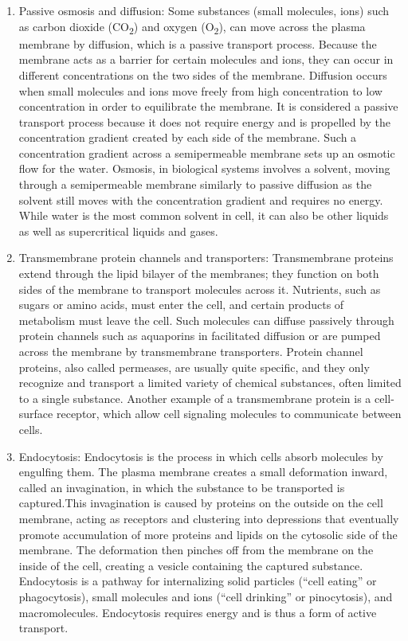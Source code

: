\documentclass[
]{book}
\begin{document}
\begin{enumerate}
\def\labelenumi{\arabic{enumi}.}
\item
  Passive osmosis and diffusion: Some substances (small molecules, ions) such as carbon dioxide (CO\textsubscript{2}) and oxygen (O\textsubscript{2}), can move across the plasma membrane by diffusion, which is a passive transport process. Because the membrane acts as a barrier for certain molecules and ions, they can occur in different concentrations on the two sides of the membrane. Diffusion occurs when small molecules and ions move freely from high concentration to low concentration in order to equilibrate the membrane. It is considered a passive transport process because it does not require energy and is propelled by the concentration gradient created by each side of the membrane. Such a concentration gradient across a semipermeable membrane sets up an osmotic flow for the water. Osmosis, in biological systems involves a solvent, moving through a semipermeable membrane similarly to passive diffusion as the solvent still moves with the concentration gradient and requires no energy. While water is the most common solvent in cell, it can also be other liquids as well as supercritical liquids and gases.
\item
  Transmembrane protein channels and transporters: Transmembrane proteins extend through the lipid bilayer of the membranes; they function on both sides of the membrane to transport molecules across it. Nutrients, such as sugars or amino acids, must enter the cell, and certain products of metabolism must leave the cell. Such molecules can diffuse passively through protein channels such as aquaporins in facilitated diffusion or are pumped across the membrane by transmembrane transporters. Protein channel proteins, also called permeases, are usually quite specific, and they only recognize and transport a limited variety of chemical substances, often limited to a single substance. Another example of a transmembrane protein is a cell-surface receptor, which allow cell signaling molecules to communicate between cells.
\item
  Endocytosis: Endocytosis is the process in which cells absorb molecules by engulfing them. The plasma membrane creates a small deformation inward, called an invagination, in which the substance to be transported is captured.This invagination is caused by proteins on the outside on the cell membrane, acting as receptors and clustering into depressions that eventually promote accumulation of more proteins and lipids on the cytosolic side of the membrane. The deformation then pinches off from the membrane on the inside of the cell, creating a vesicle containing the captured substance. Endocytosis is a pathway for internalizing solid particles (``cell eating'' or phagocytosis), small molecules and ions (``cell drinking'' or pinocytosis), and macromolecules. Endocytosis requires energy and is thus a form of active transport.

\end{enumerate}
\end{document}
